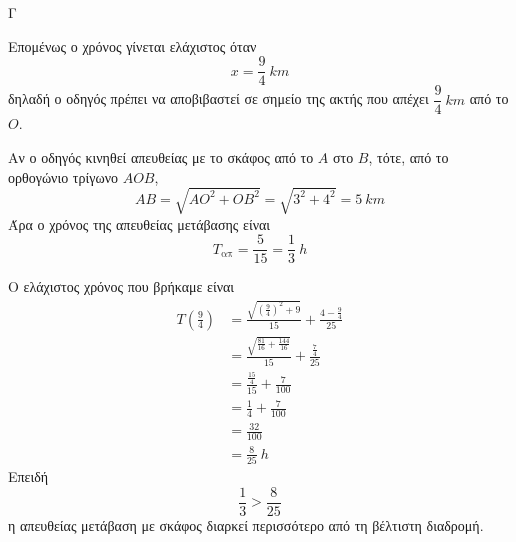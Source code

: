 \begin{thema}{Γ}
\begin{erwthma}
Επομένως ο χρόνος γίνεται ελάχιστος όταν
\[x=\frac{9}{4}\ \si{km}\]
δηλαδή ο οδηγός πρέπει να αποβιβαστεί σε σημείο της ακτής που απέχει $\dfrac{9}{4}\ \si{km}$ από το $O$.

\item Αν ο οδηγός κινηθεί απευθείας με το σκάφος από το $A$ στο $B$, τότε, από το ορθογώνιο τρίγωνο $AOB$,
\[AB=\sqrt{AO^2+OB^2}=\sqrt{3^2+4^2}=5\ \si{km}\]
Άρα ο χρόνος της απευθείας μετάβασης είναι
\[T_{\text{απ}}=\frac{5}{15}=\frac{1}{3}\ \si{h}\]

Ο ελάχιστος χρόνος που βρήκαμε είναι
\begin{align*}
T\left(\frac{9}{4}\right)
&=\frac{\sqrt{\left(\frac{9}{4}\right)^2+9}}{15}+\frac{4-\frac{9}{4}}{25}\\
&=\frac{\sqrt{\frac{81}{16}+\frac{144}{16}}}{15}+\frac{\frac{7}{4}}{25}\\
&=\frac{\frac{15}{4}}{15}+\frac{7}{100}\\
&=\frac{1}{4}+\frac{7}{100}\\
&=\frac{32}{100}\\
&=\frac{8}{25}\ \si{h}
\end{align*}
Επειδή
\[\frac{1}{3}>\frac{8}{25}\]
η απευθείας μετάβαση με σκάφος διαρκεί περισσότερο από τη βέλτιστη διαδρομή.
\end{erwthma}
\end{thema}
